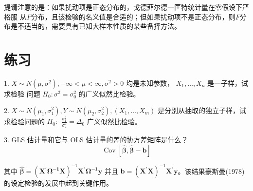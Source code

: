     提请注意的是：如果扰动项是正态分布的，戈德菲尔德一匡特统计量在零假设下严格服
    从$ F $分布，且该检验的名义值是合适的；但如果扰动项不是正态分布，则$ F $分布是不适当的，需要具有已知大样本性质的某些备择方法。

\section{练习}

1. $ X \sim N\left(\mu, \sigma^{2}\right),-\infty<\mu<\infty, \sigma^{2}>0 $ 均是未知参数， 
   $ X_{1}, \ldots, X_{n}$ 是一子样，试求检验 问题 $ H_0: \sigma^{2} =  \sigma_{0}^{2} $ 的广义似然比检验。

2. $ X \sim N\left(\mu_{1}, \sigma_{1}^{2}\right), Y \sim N\left(\mu_{2}, \sigma_{2}^{2}\right),\left(X_{1}, \ldots, X_{m}\right) $
    是分别从抽取的独立子样，试求检验问题的 $ H_{0} : \ \ \frac{\sigma_{1}^{2}}{\sigma_{2}^{2}}=\Delta_{0} $ 广义似然比检验。

3. GLS 估计量和它与 OLS 估计量的差的协方差矩阵是什么？
$$ \operatorname{Cov}[\boldsymbol{\hat{\beta}}, \boldsymbol{\hat{\beta}-b}] $$

其中 $ \boldsymbol{\hat{\beta}} = \left(\boldsymbol{X^{\prime} \Omega^{-1} X}\right)^{-1} \boldsymbol{X^{\prime} \Omega^{-1} y}$
并且 $ \boldsymbol{b} = \left(\boldsymbol{X^{\prime} X}\right)^{-1} \boldsymbol{X^{\prime} y}$。该结果豪斯曼(1978)的设定检验的发展中起到关键作用。
